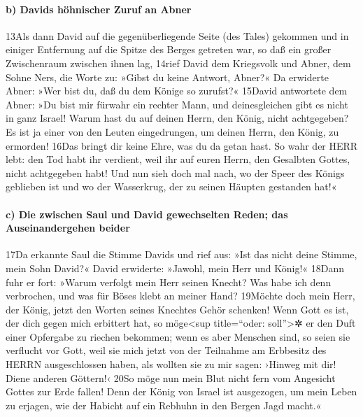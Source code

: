 \hypertarget{b-davids-huxf6hnischer-zuruf-an-abner}{%
\paragraph{b) Davids höhnischer Zuruf an
Abner}\label{b-davids-huxf6hnischer-zuruf-an-abner}}

13Als dann David auf die gegenüberliegende Seite (des Tales) gekommen
und in einiger Entfernung auf die Spitze des Berges getreten war, so daß
ein großer Zwischenraum zwischen ihnen lag, 14rief David dem Kriegsvolk
und Abner, dem Sohne Ners, die Worte zu: »Gibst du keine Antwort,
Abner?« Da erwiderte Abner: »Wer bist du, daß du dem Könige so zurufst?«
15David antwortete dem Abner: »Du bist mir fürwahr ein rechter Mann, und
deinesgleichen gibt es nicht in ganz Israel! Warum hast du auf deinen
Herrn, den König, nicht achtgegeben? Es ist ja einer von den Leuten
eingedrungen, um deinen Herrn, den König, zu ermorden! 16Das bringt dir
keine Ehre, was du da getan hast. So wahr der HERR lebt: den Tod habt
ihr verdient, weil ihr auf euren Herrn, den Gesalbten Gottes, nicht
achtgegeben habt! Und nun sieh doch mal nach, wo der Speer des Königs
geblieben ist und wo der Wasserkrug, der zu seinen Häupten gestanden
hat!«

\hypertarget{c-die-zwischen-saul-und-david-gewechselten-reden-das-auseinandergehen-beider}{%
\paragraph{c) Die zwischen Saul und David gewechselten Reden; das
Auseinandergehen
beider}\label{c-die-zwischen-saul-und-david-gewechselten-reden-das-auseinandergehen-beider}}

17Da erkannte Saul die Stimme Davids und rief aus: »Ist das nicht deine
Stimme, mein Sohn David?« David erwiderte: »Jawohl, mein Herr und
König!« 18Dann fuhr er fort: »Warum verfolgt mein Herr seinen Knecht?
Was habe ich denn verbrochen, und was für Böses klebt an meiner Hand?
19Möchte doch mein Herr, der König, jetzt den Worten seines Knechtes
Gehör schenken! Wenn Gott es ist, der dich gegen mich erbittert hat, so
möge\textless sup title=``oder: soll''\textgreater✲ er den Duft einer
Opfergabe zu riechen bekommen; wenn es aber Menschen sind, so seien sie
verflucht vor Gott, weil sie mich jetzt von der Teilnahme am Erbbesitz
des HERRN ausgeschlossen haben, als wollten sie zu mir sagen: ›Hinweg
mit dir! Diene anderen Göttern!‹ 20So möge nun mein Blut nicht fern vom
Angesicht Gottes zur Erde fallen! Denn der König von Israel ist
ausgezogen, um mein Leben zu erjagen, wie der Habicht auf ein Rebhuhn in
den Bergen Jagd macht.«

